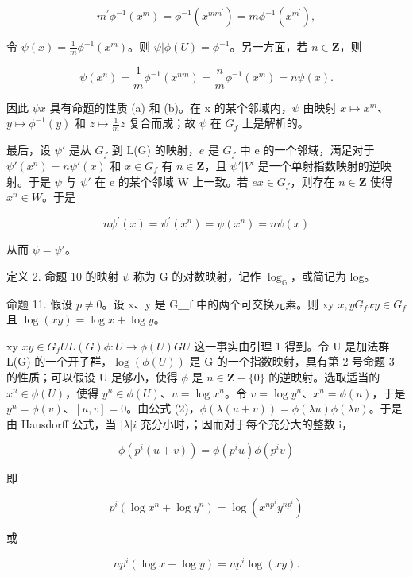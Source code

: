 \[
m ^ {\prime} \phi^ {- 1} (x ^ {m}) = \phi^ {- 1} (x ^ {m m ^ {\prime}}) = m \phi^ {- 1} (x ^ {m ^ {\prime}}),
\]

令 \(\psi(x) = \frac{1}{m}\phi^{-1}(x^m)\)。则 \(\psi|\phi(U) = \phi^{-1}\)。另一方面，若 \(n \in \mathbf{Z}\)，则

\[
\psi (x ^ {n}) = \frac {1}{m} \phi^ {- 1} (x ^ {n m}) = \frac {n}{m} \phi^ {- 1} (x ^ {m}) = n \psi (x).
\]

因此 \(\psi\)\(x\) 具有命题的性质 (a) 和 (b)。在 x 的某个邻域内，\(\psi\) 由映射 \(x \mapsto x^m\)、\(y \mapsto \phi^{-1}(y)\) 和 \(z \mapsto \frac{1}{m} z\) 复合而成；故 \(\psi\) 在 \(G_f\) 上是解析的。

最后，设 \(\psi'\) 是从 \(G_f\) 到 L(G) 的映射，\(e\) 是 \(G_f\) 中 e 的一个邻域，满足对于 \(\psi'(x^n) = n\psi'(x)\) 和 \(x \in G_f\) 有 \(n \in \mathbf{Z}\)，且 \(\psi'|V'\) 是一个单射指数映射的逆映射。于是 \(\psi\) 与 \(\psi'\) 在 e 的某个邻域 W 上一致。若 \(e\)\(x \in G_f\)，则存在 \(n \in \mathbf{Z}\) 使得 \(x^n \in W\)。于是

\[
n \psi^ {\prime} (x) = \psi^ {\prime} (x ^ {n}) = \psi (x ^ {n}) = n \psi (x)
\]

从而 \(\psi = \psi'\)。

定义 2. 命题 10 的映射 \(\psi\) 称为 G 的对数映射，记作 \(\log_{\mathbb{G}}\)，或简记为 log。

命题 11. 假设 \(p \neq 0\)。设 x、y 是 G＿f 中的两个可交换元素。则 xy \(x, y\)\(G_f\)\(xy \in G_f\) 且 \(\log(xy) = \log x + \log y\)。

xy \(xy \in G_f\)\(U\)\(L(G)\)\(\phi: U \to \phi(U)\)\(G\)\(U\) 这一事实由引理 1 得到。令 U 是加法群 L(G) 的一个开子群，\(\log(\phi(U))\) 是 G 的一个指数映射，具有第 2 号命题 3 的性质；可以假设 U 足够小，使得 \(\phi\) 是 \(n \in \mathbf{Z} - \{0\}\) 的逆映射。选取适当的 \(x^n \in \phi(U)\)，使得 \(y^n \in \phi(U)\)、\(u = \log x^n\)。令 \(v = \log y^n\)、\(x^n = \phi(u)\)，于是 \(y^n = \phi(v)\)、\([u,v] = 0\)。由公式 (2)，\(\phi(\lambda(u + v)) = \phi(\lambda u)\phi(\lambda v)\)。于是由 Hausdorff 公式，当 \(|\lambda|\)\(i\) 充分小时，；因而对于每个充分大的整数 i，

\[
\phi (p ^ {i} (u + v)) = \phi (p ^ {i} u) \phi (p ^ {i} v)
\]

即

\[
p ^ {i} (\log x ^ {n} + \log y ^ {n}) = \log (x ^ {n p ^ {i}} y ^ {n p ^ {i}})
\]

或

\[
n p ^ {i} (\log x + \log y) = n p ^ {i} \log (x y).
\]

